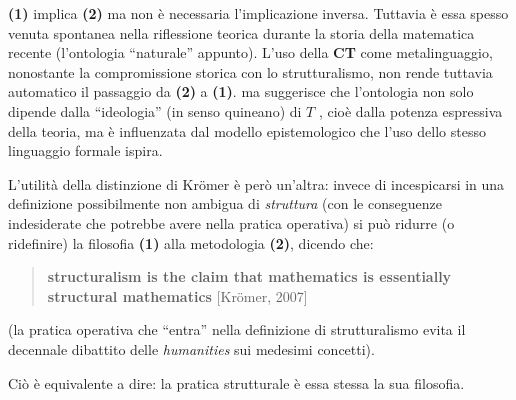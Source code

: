 \documentclass[a4paper, 11pt]{article}
\begin{document}
	\textbf{(1)} implica \textbf{(2)} ma non è necessaria l'implicazione inversa. \endfo Tuttavia è essa spesso venuta spontanea nella riflessione teorica durante la storia della matematica recente (l'ontologia ``naturale'' appunto). L'uso della \textbf{CT} come metalinguaggio, nonostante la compromissione storica con lo strutturalismo, non rende tuttavia automatico il passaggio da \textbf{(2)} a \textbf{(1)}. ma suggerisce che l'ontologia non solo dipende dalla ``ideologia'' (in senso quineano) di $T$ \endfo, cioè dalla potenza espressiva della teoria, ma è influenzata dal modello epistemologico che l'uso dello stesso linguaggio formale ispira.
	
	L'utilità della distinzione di Kr\"omer è però un'altra: invece di incespicarsi in una definizione possibilmente non ambigua di \textit{struttura} (con le conseguenze indesiderate che potrebbe avere nella pratica operativa) si può ridurre (o ridefinire) la filosofia \textbf{(1)} alla metodologia \textbf{(2)}, dicendo che:
	\begin{quotation}
		\textbf{structuralism is the claim that mathematics
			is essentially structural mathematics} [Kr\"omer, 2007]
	\end{quotation}
	(la pratica operativa che ``entra'' nella definizione di strutturalismo evita il decennale dibattito delle \textit{humanities} sui medesimi concetti).
	
	Ciò è equivalente a dire: la pratica strutturale è essa stessa la sua filosofia.
	
\end{document}
